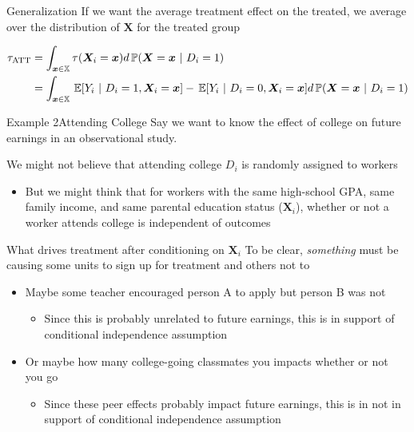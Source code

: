 \documentclass[aspectratio=169,t,11pt,table]{beamer}
\begin{document}
\begin{frame}{Generalization}
  If we want the average treatment effect on the treated, we average over the distribution of $\bm{X}$ for the treated group
  
  \vspace*{-\medskipamount}
  \begin{align*}
    \tau_{\text{ATT}} &= 
    \int_{\bm{x} \in \mathbb{X}} \tau(\bm{X}_i = \bm{x}) d\prob{\bm{X} = \bm{x}}{D_i = 1}\\ 
    &= \int_{\bm{x} \in \mathbb{X}} \expec{Y_i}{D_i = 1, \bm{X}_i = \bm{x}} - \expec{Y_i}{D_i = 0, \bm{X}_i = \bm{x}} d\prob{\bm{X} = \bm{x}}{D_i = 1}
  \end{align*}
\end{frame}

\begin{frame}{Example 2}{Attending College}
  Say we want to know the effect of college on future earnings in an observational study. 
  
  \bigskip
  We might not believe that attending college $D_i$ is randomly assigned to workers
  \begin{itemize}
    \item But we might think that for workers with the same high-school GPA, same family income, and same parental education status ($\bm{X}_i$), whether or not a worker attends college is independent of outcomes
  \end{itemize}
\end{frame}

\begin{frame}{What drives treatment after conditioning on $\bm{X}_i$}
  To be clear, \emph{something} must be causing some units to sign up for treatment and others not to
  \begin{itemize}
    \item Maybe some teacher encouraged person A to apply but person B was not 
    \begin{itemize}
      \item Since this is probably unrelated to future earnings, this is in support of conditional independence assumption
    \end{itemize}
    
    \pause
    \item Or maybe how many college-going classmates you impacts whether or not you go
    \begin{itemize}
      \item Since these peer effects probably impact future earnings, this is in not in support of conditional independence assumption
    \end{itemize}
  \end{itemize}
\end{frame}
\end{document}
